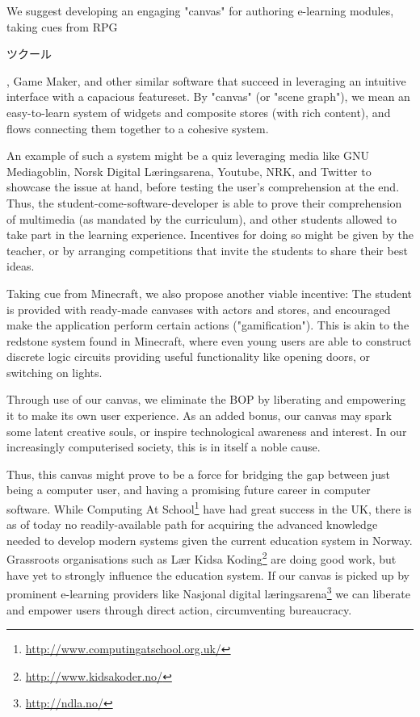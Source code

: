 We suggest developing an engaging "canvas"  for authoring e-learning modules, 
taking cues from RPG\begin{CJK}{UTF8}{min}ツクール\end{CJK}, Game Maker, and 
other similar software that succeed in leveraging an intuitive interface with 
a capacious featureset. By "canvas" (or "scene graph"), we mean an 
easy-to-learn system of widgets and composite stores (with rich content), and 
flows connecting them together to a cohesive system. 

An example of such a system might be a quiz leveraging media like GNU 
Mediagoblin, Norsk Digital Læringsarena, Youtube, NRK, and Twitter to showcase 
the issue at hand, before testing the user's comprehension at the end. Thus, 
the student-come-software-developer is able to prove their comprehension of 
multimedia (as mandated by the curriculum), and other students allowed to take 
part in the learning experience. Incentives for doing so might be given by the 
teacher, or by arranging competitions that invite the students to share their 
best ideas.

Taking cue from Minecraft, we also propose another viable incentive: The student
is provided with ready-made canvases with actors and stores, and encouraged make
the application perform certain actions ("gamification"). This is akin to the
redstone system found in Minecraft, where even young users are able to construct
discrete logic circuits providing useful functionality like opening doors, or
switching on lights.

Through use of our canvas, we eliminate the BOP by liberating and empowering 
it to make its own user experience. As an added bonus, our canvas may spark 
some latent creative souls, or inspire technological awareness and interest. 
In our increasingly computerised society, this is in itself a noble cause. 

Thus, this canvas might prove to be a force for bridging the gap between just 
being a computer user, and having a promising future career in computer 
software. While Computing At 
School\footnote{\url{http://www.computingatschool.org.uk/}} have had great 
success in the UK, there is as of today no readily-available path for 
acquiring the advanced knowledge needed to develop modern systems given the 
current education system in Norway. Grassroots organisations such as Lær Kidsa 
Koding\footnote{\url{http://www.kidsakoder.no/}} are doing good work, but have 
yet to strongly influence the education system. If our canvas is picked up by 
prominent e-learning providers like Nasjonal digital 
læringsarena\footnote{\url{http://ndla.no/}} we can liberate and empower users 
through direct action, circumventing bureaucracy.

